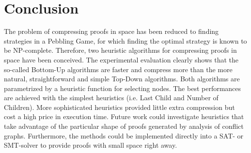 \section{Conclusion}
\label{sec:conclusion}

The problem of compressing proofs in space has been reduced to finding strategies in a Pebbling Game, 
for which finding the optimal strategy is known to be NP-complete.
Therefore, two heuristic algorithms for compressing proofs in space have been conceived. 
The experimental evaluation clearly shows that the so-called Bottom-Up algorithms are faster and compress more than the more natural, 
straightforward and simple Top-Down algorithms. 
Both algorithms are parametrized by a heuristic function for selecting nodes. 
The best performances are achieved with the simplest heuristics (i.e. Last Child and Number of Children). 
More sophisticated heuristics provided little extra compression but cost a high price in execution time. 
Future work could investigate heuristics that take advantage of the particular shape of proofs generated by analysis of conflict graphs.
Furthermore, the methods could be implemented directly into a SAT- or SMT-solver to provide proofs with small space right away.



